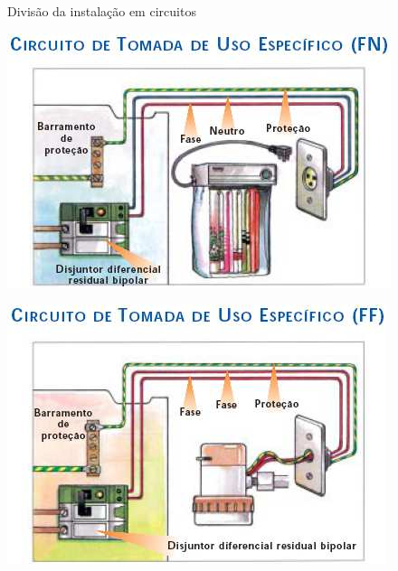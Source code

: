 \begin{frame}{Divisão da instalação em circuitos}
	\begin{minipage}{0.49\linewidth}
		\centering
		\includegraphics[width=1\linewidth]{Figuras/Ch05/fig11}
	\end{minipage}\hfill
	\begin{minipage}{0.49\linewidth}
		\centering
		\includegraphics[width=1\linewidth]{Figuras/Ch05/fig12}
	\end{minipage}
\end{frame}


